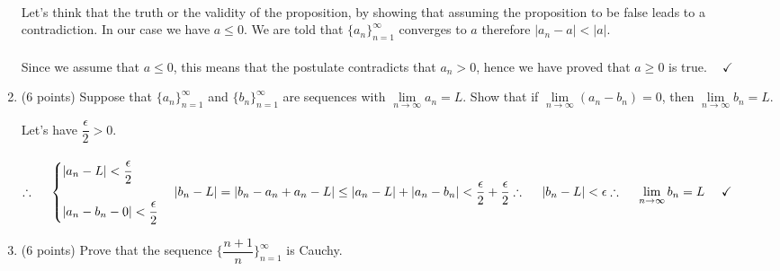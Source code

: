 \documentclass[fleqn]{article}
\begin{document}
\begin{enumerate}
      \textcolor{hwColor}{
        \\
        Let's think that the truth or the validity of the proposition, by showing that assuming the proposition 
        to be false leads to a contradiction. In our case we have $a \leq 0$. We are told that 
        $\{a_n\}_{n=1}^{\infty}$ converges to $a$ therefore $|a_n-a| < |a|$. 
        \\
        \\
        Since we assume that $a \leq 0$, this means that the postulate contradicts that $a_n >0$, hence we have proved that
        $a \geq 0$ is true. $~~~~ \checkmark$
      }


    \item (6 points) Suppose that $\{a_n\}_{n=1}^{\infty}$ and $\{b_n\}_{n=1}^{\infty}$ are sequences with $\lim\limits_{n\to\infty} a_n=L$.
    Show that if $\lim\limits_{n\to\infty} (a_n-b_n)=0$, then $\lim\limits_{n\to\infty} b_n=L$.

      \textcolor{hwColor}{
        Let's have $\dfrac{\epsilon}{2}>0$.
        \\
        \\
        $
          \therefore ~~~~ \begin{cases}
            |a_n-L|< \dfrac{\epsilon}{2}
            \\
            \\
            |a_n-b_n-0|< \dfrac{\epsilon}{2}
          \end{cases}
          \\
          \\
          \\
          |b_n-L|=|b_n-a_n+a_n-L| \leq |a_n-L|+|a_n-b_n|< \dfrac{\epsilon}{2}+\dfrac{\epsilon}{2}
          \\
          \\
          \\
          \therefore ~~~~ |b_n-L|<\epsilon
          \\
          \\
          \\
          \therefore ~~~~ \lim\limits_{n\to\infty} b_n=L ~~~~ \checkmark
        $
      }

    \item (6 points) Prove that the sequence $\{\dfrac{n+1}{n}\}_{n=1}^{\infty}$ is Cauchy.


\end{enumerate}
\end{document}
